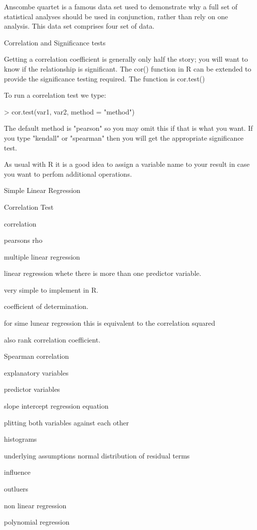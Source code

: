 Anscombe quartet is a famous data set used to demonstrate why a full set of statistical analyses should be used in conjunction, rather than rely on one analysis. This data set comprises four set of data.


Correlation and Significance tests

Getting a correlation coefficient is generally only half the story; you will want to know if the relationship is significant. The cor() function in R can be extended to provide the significance testing required. The function is cor.test()


To run a correlation test we type:

> cor.test(var1, var2, method = "method")

The default method is "pearson" so you may omit this if that is what you want. If you type "kendall" or "spearman" then you will get the appropriate significance test.

As usual with R it is a good idea to assign a variable name to your result in case you want to perfom additional operations.

Simple Linear Regression

Correlation Test

correlation

pearsons rho



 multiple linear regression


linear regression whete there is more than one predictor variable.

very simple to implement in R.


coefficient of determination. 

for sime lunear regression this is equivalent to the correlation squared


also rank correlation coefficient.

Spearman correlation




explanatory variables

predictor variables

slope intercept regression  equation

plitting both variables against each other

histograms 


underlying assumptions normal distribution of residual terms


influence

outluers

 non linear regression

 polynomial regression

